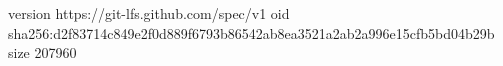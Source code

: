 version https://git-lfs.github.com/spec/v1
oid sha256:d2f83714c849e2f0d889f6793b86542ab8ea3521a2ab2a996e15cfb5bd04b29b
size 207960
